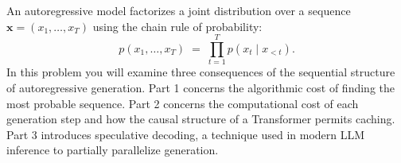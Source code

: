 \documentclass[submit]{harvardml}
\begin{document}
\newpage

\begin{problem}
An autoregressive model factorizes a joint distribution over a sequence $\mathbf{x} = (x_1, \ldots, x_T)$ using the chain rule of probability:
\[
p(x_1, \ldots, x_T) \;=\; \prod_{t=1}^{T} p(x_t \mid x_{<t}).
\]
In this problem you will examine three consequences of the sequential structure of autoregressive generation. Part 1 concerns the algorithmic cost of finding the most probable sequence. Part 2 concerns the computational cost of each generation step and how the causal structure of a Transformer permits caching. Part 3 introduces speculative decoding, a technique used in modern LLM inference to partially parallelize generation.
\end{problem}
\end{document}

